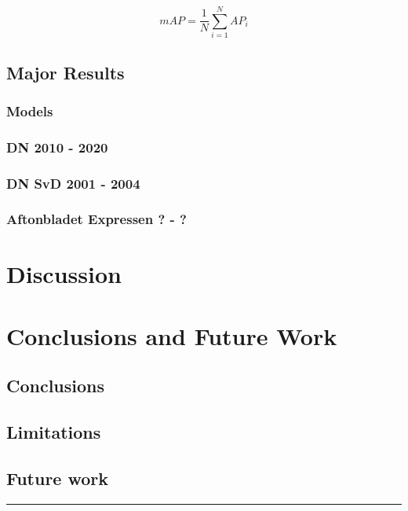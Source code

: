 \documentclass[english, bibtex]{kththesis}
\begin{document}
\begin{equation}
mAP = \frac{1}{N} \sum_{i=1}^{N} AP_i
    \label{eqn:map}
\end{equation}

\section{Major Results}

\subsection{Models}

\subsection{DN 2010 - 2020}
\subsection{DN SvD 2001 - 2004}
\subsection{Aftonbladet Expressen ? - ?}


\chapter{Discussion}
\label{ch:disc}

\chapter{Conclusions and Future Work}
\section{Conclusions}
\section{Limitations}
\section{Future work}


\noindent\rule{\textwidth}{0.4mm}

\cleardoublepage
\renewcommand{\bibname}{References}
\end{document}
